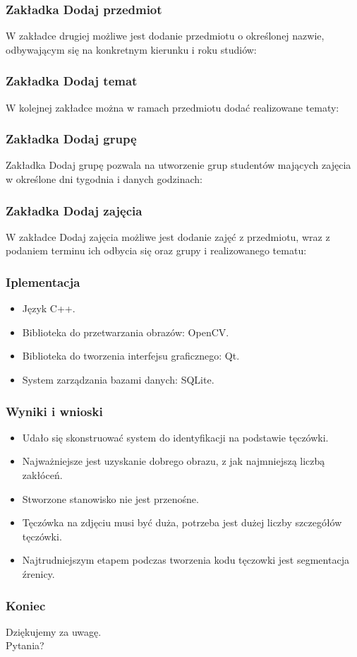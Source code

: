 \documentclass{beamer}
\begin{document}
\begin{frame}
\frametitle{Zakładka Dodaj przedmiot}
W zakładce drugiej możliwe jest dodanie przedmiotu o określonej nazwie, odbywającym się na konkretnym kierunku i roku studiów:

\end{frame}

\begin{frame}
\frametitle{Zakładka Dodaj temat}
W kolejnej zakładce można w ramach przedmiotu dodać realizowane tematy:

\end{frame}

\begin{frame}
\frametitle{Zakładka Dodaj grupę}
Zakładka Dodaj grupę pozwala na utworzenie grup studentów mających zajęcia w określone dni tygodnia i danych godzinach:

\end{frame}

\begin{frame}
\frametitle{Zakładka Dodaj zajęcia}
W zakładce Dodaj zajęcia możliwe jest dodanie zajęć z przedmiotu, wraz z podaniem terminu ich odbycia się oraz grupy i realizowanego tematu:

\end{frame}

\begin{frame}
\frametitle{Iplementacja}
\begin{itemize}
\item Język C++.
\item Biblioteka do przetwarzania obrazów: OpenCV.
\item Biblioteka do tworzenia interfejsu graficznego: Qt.
\item System zarządzania bazami danych: SQLite.
\end{itemize}
\end{frame}



\begin{frame}
\frametitle{Wyniki i wnioski}
\begin{itemize}
\item Udało się skonstruować system do identyfikacji na podstawie tęczówki.
\item Najważniejsze jest uzyskanie dobrego obrazu, z jak najmniejszą liczbą zakłóceń.
\item Stworzone stanowisko nie jest przenośne.
\item Tęczówka na zdjęciu musi być duża, potrzeba jest dużej liczby szczegółów tęczówki.
\item Najtrudniejszym etapem podczas tworzenia kodu tęczowki jest segmentacja źrenicy.
\end{itemize}
\end{frame}

\begin{frame}
\frametitle{Koniec}

\begin{block}{}
Dziękujemy za uwagę.\\
Pytania?
\end{block}

\end{frame}

\end{document}
